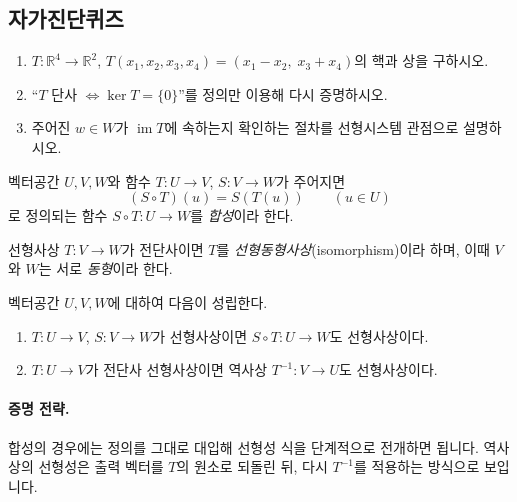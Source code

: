 \subsection*{자가진단퀴즈}
\begin{enumerate}[label=\arabic*.]
\item $T:\mathbb{R}^4\to\mathbb{R}^2$, $T(x_1,x_2,x_3,x_4)=(x_1-x_2,\;x_3+x_4)$의 핵과 상을 구하시오.
\item ``$T$ 단사 $\Leftrightarrow \ker T=\{0\}$''를 정의만 이용해 다시 증명하시오.
\item 주어진 $w\in W$가 $\operatorname{im}T$에 속하는지 확인하는 절차를 선형시스템 관점으로 설명하시오.
\end{enumerate}


\begin{definition}
벡터공간 $U,V,W$와 함수 $T:U\to V$, $S:V\to W$가 주어지면
\[
(S\circ T)(u)=S(T(u))\qquad (u\in U)
\]
로 정의되는 함수 $S\circ T:U\to W$를 \emph{합성}이라 한다.
\end{definition}

\begin{definition}
선형사상 $T:V\to W$가 전단사이면 $T$를 \emph{선형동형사상}(isomorphism)이라 하며, 이때 $V$와 $W$는 서로 \emph{동형}이라 한다.
\end{definition}

\begin{theorem}
벡터공간 $U,V,W$에 대하여 다음이 성립한다.
\begin{enumerate}[label=(\roman*)]
\item $T:U\to V$, $S:V\to W$가 선형사상이면 $S\circ T:U\to W$도 선형사상이다.
\item $T:U\to V$가 전단사 선형사상이면 역사상 $T^{-1}:V\to U$도 선형사상이다.
\end{enumerate}
\end{theorem}

\paragraph{증명 전략.}
합성의 경우에는 정의를 그대로 대입해 선형성 식을 단계적으로 전개하면 됩니다. 역사상의 선형성은 출력 벡터를 $T$의 원소로 되돌린 뒤, 다시 $T^{-1}$를 적용하는 방식으로 보입니다.


